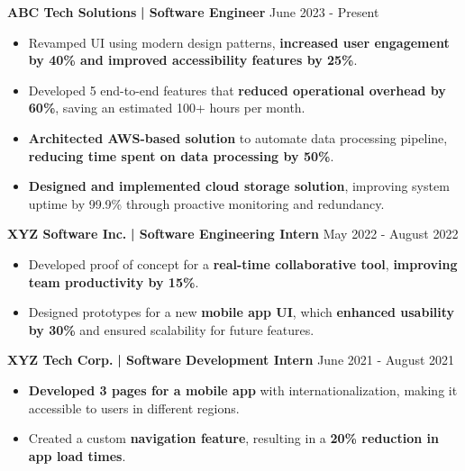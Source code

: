 \documentclass[a4paper,10.85pt]{article}
\begin{document}
\textbf{ABC Tech Solutions}\textbf{ | Software Engineer} \hfill  June 2023 - Present\\
\vspace{1mm}
\begin{itemize}[leftmargin=*, itemsep=-2pt, topsep=0pt]
\item  Revamped UI using modern design patterns, \textbf{increased user engagement by 40\% and improved accessibility features by 25\%}.
\item  Developed 5 end-to-end features that \textbf{reduced operational overhead by 60\%}, saving an estimated 100+ hours per month.
\item  \textbf{Architected AWS-based solution} to automate data processing pipeline, \textbf{reducing time spent on data processing by 50\%}.
\item  \textbf{Designed and implemented cloud storage solution}, improving system uptime by 99.9\% through proactive monitoring and redundancy.
\end{itemize}
\vspace{1mm}
\textbf{XYZ Software Inc.}\textbf{ | Software Engineering Intern} \hfill  May 2022 - August 2022\\
\vspace{1mm}
\begin{itemize}[leftmargin=*, itemsep=-2pt, topsep=0pt]
\item  Developed proof of concept for a \textbf{real-time collaborative tool}, \textbf{improving team productivity by 15\%}.
\item  Designed prototypes for a new \textbf{mobile app UI}, which \textbf{enhanced usability by 30\%} and ensured scalability for future features.
\end{itemize}
\vspace{1mm}
\textbf{XYZ Tech Corp.}\textbf{ | Software Development Intern} \hfill  June 2021 - August 2021\\
\vspace{1mm}
\begin{itemize}[leftmargin=*, itemsep=-2pt, topsep=0pt]
\item  \textbf{Developed 3 pages for a mobile app} with internationalization, making it accessible to users in different regions.
\item  Created a custom \textbf{navigation feature}, resulting in a \textbf{20\% reduction in app load times}.
\end{itemize}
\vspace{1.5mm}
\end{document}
